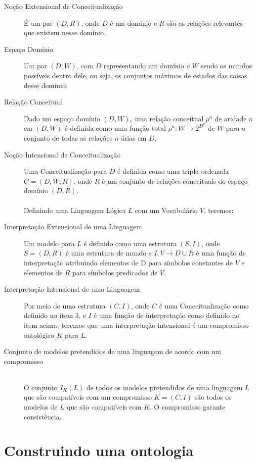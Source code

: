 \begin{description}
	\item[Noção Extensional de Conceitualização] É um par $(D,R)$, onde $D$ é um domínio e $R$ são as relações relevantes que existem nesse domínio.
	\item[Espaço Domínio] Um par $(D,W)$, com $ D $ representando um domínio e $ W $ sendo os mundos possíveis dentro dele, ou seja, os conjuntos máximos de estados das coisas desse domínio.
	\item[Relação Conceitual] Dado um espaço domínio $ (D,W) $, uma relação conceitual $ \rho^n $ de aridade $ n $ em $ (D,W) $ é definida como uma função total $ \rho^n : W \to 2^{D^n}$ de $ W $ para o conjunto de todas as relações $ n $-árias em $ D $.
	\item[Noção Intensional de Conceitualização] Uma Conceitualização para $ D $ é definida como uma tripla ordenada $ C=(D,W,R) $, onde $ R $ é um conjunto de relações conceituais do espaço domínio $ (D,R) $. \\ \\
	Definindo uma Linguagem Lógica $ L $ com um Vocabulário $ V $, teremos:
	\item[Interpretação Extensional de uma Linguagem] Um modelo para $ L $ é definido como uma estrutura $ (S,I) $, onde $ S=(D,R) $ é uma estrutura de mundo e $ I : V \to D \cup R $ é uma função de interpretação atribuindo elementos de D para símbolos constantes de $ V $ e elementos de $ R $ para símbolos predicados de $ V $.
	\item[Interpretação Intensional de uma Linguagem] Por meio de uma estrutura $ (C, I) $, onde $ C $ é uma Conceitualização como definido no item 3, e $ I $ é uma função de interpretação como definido no item acima, teremos que uma interpretação intensional é um compromisso ontológico $ K $ para $ L $. 
	\item[Conjunto de modelos pretendidos de uma linguagem de acordo com um compromisso] \hfill \\ O conjunto $ I_K(L) $ de todos os modelos pretendidos de uma linguagem $ L $ que são compatíveis com um compromisso $ K = (C,I) $ são todos os modelos de $ L $ que são compatíveis com $ K $. O compromisso garante consistência.
\end{description}

\section{Construindo uma ontologia}

